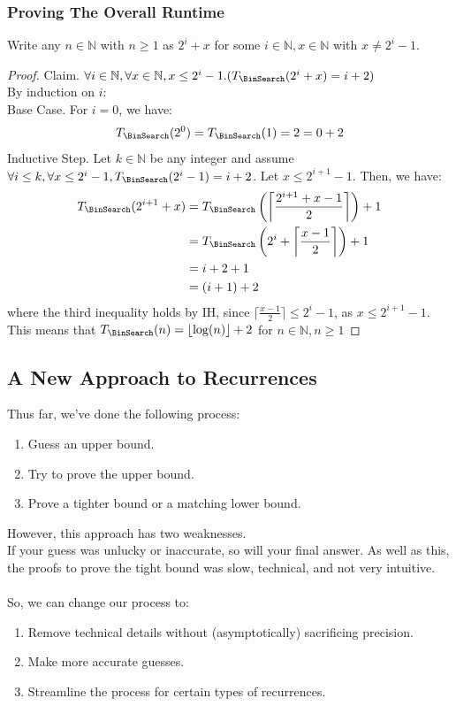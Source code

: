 \documentclass{article}
\begin{document}
\subsubsection{Proving The Overall Runtime}
Write any $n \in \mathbb{N}$ with $n \geq 1$ as $2^i + x$ for some $i \in \mathbb{N}, x \in \mathbb{N}$ with $x \neq 2^i - 1$.
\begin{proof}
Claim. $\forall i \in \mathbb{N}, \forall x \in \mathbb{N}, x \leq 2^i - 1.(T_{\BinSearch}(2^i + x) = i + 2)$\\
By induction on $i$:\\
Base Case. For $i = 0$, we have:
$$T_{\BinSearch}(2^0) = T_{\BinSearch}(1) = 2 = 0 + 2$$
Inductive Step. Let $k \in \mathbb{N}$ be any integer and assume $\forall i \leq k, \forall x \leq 2^i - 1, T_{\BinSearch}(2^i - 1) = i + 2$. Let $x \leq 2^{i + 1} - 1$. Then, we have:
\begin{align*}
    T_{\BinSearch}(2^{i + 1} + x) & = T_{\BinSearch}\left(\left\lceil\frac{2^{i + 1} + x - 1}{2}\right\rceil\right) + 1\\
    & = T_{\BinSearch}\left(2^i + \left\lceil\frac{x-1}{2}\right\rceil\right) + 1\\
    & = i + 2 + 1\\
    & = (i +1) + 2
\end{align*}
where the third inequality holds by IH, since $\lceil \frac{x - 1}{2} \rceil \leq 2^i - 1$, as $x \leq 2^{i + 1} - 1$.\\
This means that $T_{\BinSearch}(n) = \lfloor\log(n)\rfloor + 2$ for $n \in \mathbb{N}, n \geq 1$
\end{proof}

\subsection{A New Approach to Recurrences}
Thus far, we've done the following process:
\begin{enumerate}
    \item Guess an upper bound.
    \item Try to prove the upper bound.
    \item Prove a tighter bound or a matching lower bound.
\end{enumerate}
However, this approach has two weaknesses.\\
If your guess was unlucky or inaccurate, so will your final answer. As well as this, the proofs to prove the tight bound was slow, technical, and not very intuitive.\\
\\
So, we can change our process to:
\begin{enumerate}
    \item Remove technical details without (asymptotically) sacrificing precision.
    \item Make more accurate guesses.
    \item Streamline the process for certain types of recurrences.
\end{enumerate}
\end{document}
